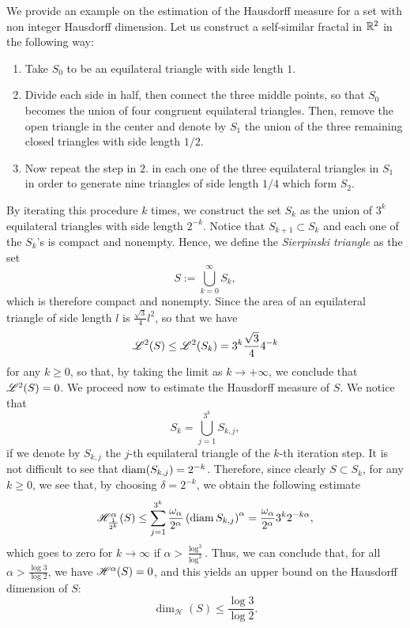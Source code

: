 \begin{example} We provide an example on the estimation of the Hausdorff measure for a set with non integer Hausdorff dimension.
Let us construct a self-similar fractal in $\mathbb{R}^{2}$ in the following way: 

\begin{enumerate}[1.]
\item Take $S_0$ to be an equilateral
triangle with side length $1$. 
\item Divide each side in half, then connect the three middle points, so that $S_0$ becomes the union of four congruent equilateral
triangles. Then, remove the open triangle in the center and denote by $S_{1}$ the union of the three remaining closed triangles with side length $1/2$.
\item Now repeat the step in $2.$ in each one of the three equilateral triangles in $S_{1}$ in order to generate nine triangles of side length $1/4$ which form $S_{2}$.
\end{enumerate}

By iterating this procedure $k$ times, we construct the set $S_k$ as the union of $3^k$ equilateral triangles with side length $2^{-k}$. Notice that $S_{k +1} \subset S_{k}$ and each one of the $S_{k}$'s is compact and nonempty. Hence, we define the {\em Sierpinski triangle} as the set
\begin{equation*}
S := \bigcup_{k=0}^\infty S_k,
\end{equation*}
which is therefore compact and nonempty. Since the area of an equilateral triangle of side length $l$ is $\frac{\sqrt{3}}{4} l^2$, so that we have
\begin{equation*}
\mathscr{L}^{2}(S) \le \mathscr{L}^{2}(S_{k}) = 3^{k} \frac{\sqrt{3}}{4} 4^{-k}
\end{equation*}
for any $k \ge 0$, so that, by taking the limit as $k \to + \infty$, we conclude that $\mathscr{L}^{2}(S) = 0$. We proceed now to estimate the Hausdorff measure of $S$. We notice that $$S_{k} = \bigcup_{j = 1}^{3^{k}} S_{k, j},$$ if we denote by $S_{k, j}$ the $j$-th equilateral triangle of the $k$-th iteration step. It is not difficult to see that $\operatorname{diam}(S_{k, j}) = 2^{-k}$. Therefore, since clearly $S \subset S_{k}$, for any $k \ge 0$, we see that, by choosing $\delta = 2^{-k}$, we obtain the following estimate
\[
\mathscr{H}^{\alpha}_{\frac{1}{2^k}}(S) 
\leq \sum_{j=1}^{3^k}
\frac{\omega_\alpha}{2^\alpha} 
\left(\operatorname{diam} S_{k,j} \right)^\alpha 
= \frac{\omega_\alpha}{2^\alpha} 3^k 2^{-k\alpha},
\]
which goes to zero for $k\to \infty$ if $\alpha >
\frac{\log^3}{\log^2}$. Thus, we can conclude that, for all $\alpha > \frac{\log{3}}{\log{2}}$, we
have $\mathscr{H}^{\alpha}(S) = 0$, and this yields an upper bound on the Hausdorff dimension of $S$:
\[
\dim_{\mathcal{H}}(S) \leq \frac{\log 3}{\log 2}.
\]
\end{example}


